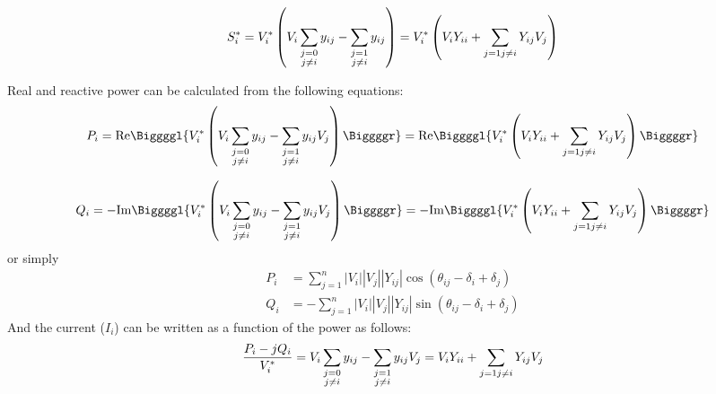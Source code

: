 \documentclass[11pt, oneside, reqno]{amsart}
\numberwithin{equation}{section}
\theoremstyle{plain}%
\theoremstyle{definition}
\theoremstyle{remark}
\begin{document}
\[
	S^*_i = V^*_i\left(V_i\sum_{\substack{j=0 \\ j\neq i}}y_{ij}-\sum_{\substack{j=1 \\ j\neq i}}y_{ij}\right)
	= V^*_i\left(V_i Y_{ii}+\sum_{j=1\\ j\neq i}Y_{ij}V_j\right)
\]

Real and reactive power can be calculated from the following equations:
\[
	P_i=\text{Re}\Biggggl\{V^*_i\left(V_i\sum_{\substack{j=0 \\ j\neq i}}y_{ij}-\sum_{\substack{j=1 \\ j\neq i}}y_{ij}V_j\right)\Biggggr\}=\text{Re}\Biggggl\{V^*_i\left(V_i Y_{ii}+\sum_{j=1\\ j\neq i}Y_{ij}V_j\right)\Biggggr\}
\]
	      
\[	
Q_i=-\text{Im}\Biggggl\{V^*_i\left(V_i\sum_{\substack{j=0 \\ j\neq i}}y_{ij}-\sum_{\substack{j=1 \\ j\neq i}}y_{ij}V_j\right)\Biggggr\}=-\text{Im}\Biggggl\{V^*_i\left(V_i Y_{ii}+\sum_{j=1\\ j\neq i}Y_{ij}V_j\right)\Biggggr\}
\]
or simply
\begin{align}
	P_i&=\sum^n_{j=1}|V_i||V_j||Y_{ij}|\cos(\theta_{ij}-\delta_i+\delta_j)\label{PV}\\
	Q_i&=-\sum^n_{j=1}|V_i||V_j||Y_{ij}|\sin(\theta_{ij}-\delta_i+\delta_j)\label{PQ}
\end{align}
And the current ($I_i$) can be written as a function of the power as follows:
\[
 \frac{P_i-jQ_i}{V^*_i}=V_i\sum_{\substack{j=0 \\ j\neq i}}y_{ij}-\sum_{\substack{j=1 \\ j\neq i}}y_{ij}V_j = V_i Y_{ii}+\sum_{j=1\\ j\neq i}Y_{ij}V_j
\]
\end{document}
